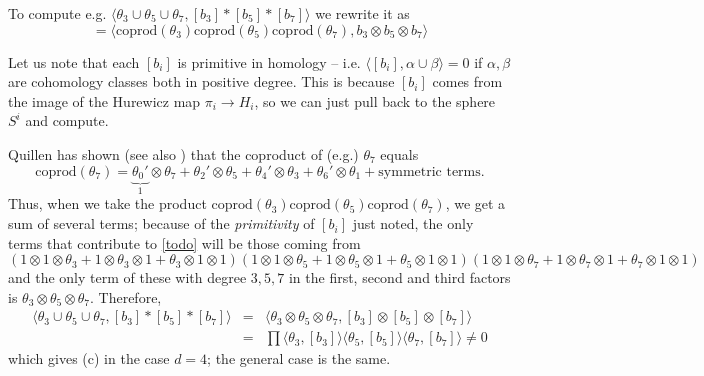 \documentclass[10pt]{amsart}
\newcommand{\coproduct}{\mathrm{coprod}}
\theoremstyle{remark}
\begin{document}
    To compute e.g. $\langle \theta_3 \cup  \theta_5 \cup \theta_7,  [b_3]  *  [b_5] * [b_7] \rangle $ we rewrite it as 
\begin{equation} \label{todo}   
= \langle \coproduct(\theta_3) \coproduct(\theta_5) \coproduct(\theta_7), b_3 \otimes b_5 \otimes b_7 \rangle  \end{equation}

Let us note that each $[b_i]$ is primitive in homology -- i.e. $\langle [b_i], \alpha \cup \beta \rangle = 0$ if $\alpha, \beta$ are cohomology classes both in positive degree. 
This is because $[b_i]$ comes from the image of the  Hurewicz map $\pi_i \rightarrow H_i$, so we can just pull back to the sphere $S^i$ and compute. 


  Quillen has shown \cite[Proposition 2]{QuillenFp} (see also \cite[Remark 2, p.569]{QuillenFp})   that  the coproduct of (e.g.) $\theta_7$ equals  $$\coproduct( \theta_7)= \underbrace{\theta_0'}_{1} \otimes  \theta_7 + \theta_2' \otimes \theta_5 +  \theta_4' \otimes \theta_3 +\theta_6' \otimes \theta_1 + \mbox{symmetric terms}.$$
Thus, when we take the product $\coproduct(\theta_3) \coproduct(\theta_5) \coproduct(\theta_7)$,
we get a sum of several terms; because of the 
  {\em primitivity} of $[b_i]$ just noted, 
  the only terms that contribute to \eqref{todo} will be
  those coming from
{\small   $$(1 \otimes 1 \otimes \theta_3 + 1 \otimes \theta_3 \otimes 1+ \theta_3 \otimes 1 \otimes 1) (1 \otimes 1 \otimes \theta_5 + 1 \otimes \theta_5 \otimes 1+ \theta_5 \otimes 1 \otimes 1) 
 (1 \otimes 1 \otimes \theta_7 + 1 \otimes \theta_7 \otimes 1+ \theta_7 \otimes 1 \otimes 1) $$}
  and the only term of these with degree $3,5,7$ in the first, second and third factors is $\theta_3 \otimes \theta_5 \otimes \theta_7$. 
Therefore, 
\begin{align*} \langle \theta_3 \cup  \theta_5 \cup \theta_7,  [b_3]  *  [b_5] * [b_7] \rangle &=&  \langle  \theta_3 \otimes \theta_5 \otimes \theta_7, [b_3] \otimes [b_5] \otimes [b_7] \rangle  \\ &=& \prod \langle \theta_{3},[b_3] \rangle \langle \theta_5, [b_5] \rangle \langle \theta_7, [b_7] \rangle \neq 0 \end{align*}
which gives (c) in the case $d=4$; the general case is the same. 
 
 
 
\end{document}

